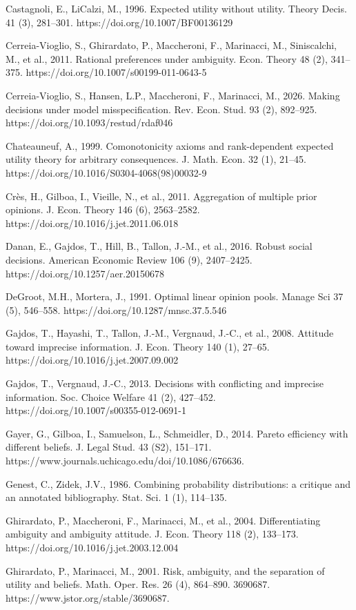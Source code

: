 \documentclass[12pt,a4paper]{article}
\newenvironment{original}
  {\par\noindent\ignorespaces}
  {\par}
\begin{document}
\begin{original}
Castagnoli, E., LiCalzi, M., 1996. Expected utility without utility. Theory Decis. 41 (3), 281--301. https://doi.org/10.1007/BF00136129

Cerreia-Vioglio, S., Ghirardato, P., Maccheroni, F., Marinacci, M., Siniscalchi, M., et al., 2011. Rational preferences under ambiguity. Econ. Theory 48 (2), 341--375. https://doi.org/10.1007/s00199-011-0643-5

Cerreia-Vioglio, S., Hansen, L.P., Maccheroni, F., Marinacci, M., 2026. Making decisions under model misspecification. Rev. Econ. Stud. 93 (2), 892--925. https://doi.org/10.1093/restud/rdaf046

Chateauneuf, A., 1999. Comonotonicity axioms and rank-dependent expected utility theory for arbitrary consequences. J. Math. Econ. 32 (1), 21--45. https://doi.org/10.1016/S0304-4068(98)00032-9

Cr\`{e}s, H., Gilboa, I., Vieille, N., et al., 2011. Aggregation of multiple prior opinions. J. Econ. Theory 146 (6), 2563--2582. https://doi.org/10.1016/j.jet.2011.06.018

Danan, E., Gajdos, T., Hill, B., Tallon, J.-M., et al., 2016. Robust social decisions. American Economic Review 106 (9), 2407--2425. https://doi.org/10.1257/aer.20150678

DeGroot, M.H., Mortera, J., 1991. Optimal linear opinion pools. Manage Sci 37 (5), 546--558. https://doi.org/10.1287/mnsc.37.5.546

Gajdos, T., Hayashi, T., Tallon, J.-M., Vergnaud, J.-C., et al., 2008. Attitude toward imprecise information. J. Econ. Theory 140 (1), 27--65. https://doi.org/10.1016/j.jet.2007.09.002

Gajdos, T., Vergnaud, J.-C., 2013. Decisions with conflicting and imprecise information. Soc. Choice Welfare 41 (2), 427--452. https://doi.org/10.1007/s00355-012-0691-1

Gayer, G., Gilboa, I., Samuelson, L., Schmeidler, D., 2014. Pareto efficiency with different beliefs. J. Legal Stud. 43 (S2), 151--171. https://www.journals.uchicago.edu/doi/10.1086/676636.

Genest, C., Zidek, J.V., 1986. Combining probability distributions: a critique and an annotated bibliography. Stat. Sci. 1 (1), 114--135.

Ghirardato, P., Maccheroni, F., Marinacci, M., et al., 2004. Differentiating ambiguity and ambiguity attitude. J. Econ. Theory 118 (2), 133--173. https://doi.org/10.1016/j.jet.2003.12.004

Ghirardato, P., Marinacci, M., 2001. Risk, ambiguity, and the separation of utility and beliefs. Math. Oper. Res. 26 (4), 864--890. 3690687. https://www.jstor.org/stable/3690687.


\end{original}
\end{document}

